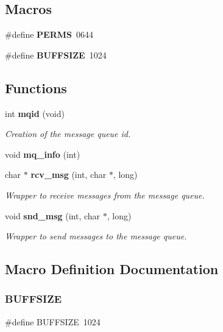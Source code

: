 \subsection*{Macros}
\begin{DoxyCompactItemize}
\item 
\#define \textbf{ P\+E\+R\+MS}~0644
\item 
\#define \textbf{ B\+U\+F\+F\+S\+I\+ZE}~1024
\end{DoxyCompactItemize}
\subsection*{Functions}
\begin{DoxyCompactItemize}
\item 
int \textbf{ mqid} (void)
\begin{DoxyCompactList}\small\item\em Creation of the message queue id. \end{DoxyCompactList}\item 
void \textbf{ mq\+\_\+info} (int)
\item 
char $\ast$ \textbf{ rcv\+\_\+msg} (int, char $\ast$, long)
\begin{DoxyCompactList}\small\item\em Wrapper to receive messages from the message queue. \end{DoxyCompactList}\item 
void \textbf{ snd\+\_\+msg} (int, char $\ast$, long)
\begin{DoxyCompactList}\small\item\em Wrapper to send messages to the message queue. \end{DoxyCompactList}\end{DoxyCompactItemize}


\subsection{Macro Definition Documentation}
\mbox{\label{mq_8h_a39912bfe2a55f30e269196f9141d845d}} 
\subsubsection{B\+U\+F\+F\+S\+I\+ZE}
{\footnotesize\ttfamily \#define B\+U\+F\+F\+S\+I\+ZE~1024}

\mbox{\label{mq_8h_afee0dce2271f56a18b4656548b2de8cc}} 
